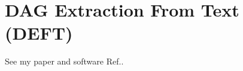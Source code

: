 \chapter{DAG Extraction From Text (DEFT)}
\label{ch-deft}
See my paper and software Ref.\cite{deft-one}.